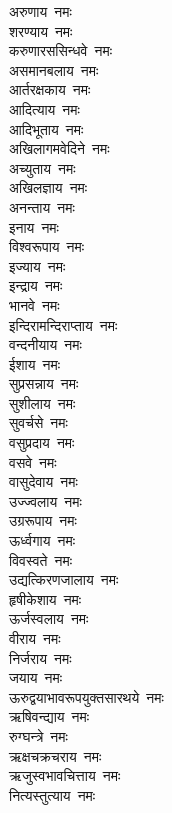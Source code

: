 \begin{flushleft}
\begin{multicols}{2}
अरुणाय~नमः\\
शरण्याय~नमः\\
करुणारससिन्धवे~नमः\\
असमानबलाय~नमः\\
आर्तरक्षकाय~नमः\\
आदित्याय~नमः\\
आदिभूताय~नमः\\
अखिलागमवेदिने~नमः\\
अच्युताय~नमः\\
अखिलज्ञाय~नमः\hfill{}\\
अनन्ताय~नमः\\
इनाय~नमः\\
विश्वरूपाय~नमः\\
इज्याय~नमः\\
इन्द्राय~नमः\\
भानवे~नमः\\
इन्दिरामन्दिराप्ताय~नमः\\
वन्दनीयाय~नमः\\
ईशाय~नमः\\
सुप्रसन्नाय~नमः\hfill{}\\
सुशीलाय~नमः\\
सुवर्चसे~नमः\\
वसुप्रदाय~नमः\\
वसवे~नमः\\
वासुदेवाय~नमः\\
उज्ज्वलाय~नमः\\
उग्ररूपाय~नमः\\
ऊर्ध्वगाय~नमः\\
विवस्वते~नमः\\
उद्यत्किरणजालाय~नमः\hfill{}\\
हृषीकेशाय~नमः\\
ऊर्जस्वलाय~नमः\\
वीराय~नमः\\
निर्जराय~नमः\\
जयाय~नमः\\
ऊरुद्वयाभावरूपयुक्तसारथये~नमः\\
ऋषिवन्द्याय~नमः\\
रुग्घन्त्रे~नमः\\
ऋक्षचक्रचराय~नमः\\
ऋजुस्वभावचित्ताय~नमः\hfill{}\\
नित्यस्तुत्याय~नमः\\

\end{multicols}
\end{flushleft}
